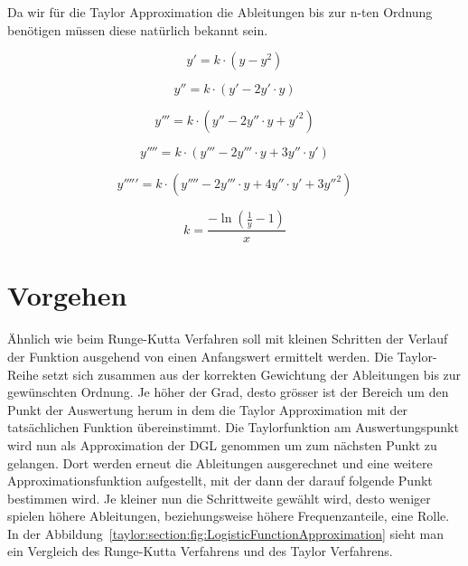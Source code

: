 Da wir für die Taylor Approximation die Ableitungen bis zur n-ten Ordnung benötigen müssen diese natürlich bekannt sein.

\begin{equation}
	y'=k\cdot (y-y^{2})
\end{equation}

\begin{equation}
	y''=k\cdot (y'-2y'\cdot y)
\end{equation}

\begin{equation}
	y'''=k\cdot (y''-2y''\cdot y+y'^{2})
\end{equation}

\begin{equation}
	y''''=k\cdot (y'''-2y'''\cdot y+3y''\cdot y')
\end{equation}

\begin{equation}
	y'''''=k\cdot (y''''-2y'''\cdot y+4y''\cdot y'+3y''^{2})
\end{equation}

\begin{equation}
	k=\frac{-\ln{(\frac{1}{y}-1)}}{x}
\end{equation}

\section{Vorgehen}
\label{taylor:subsection:Vorgehen}
Ähnlich wie beim Runge-Kutta Verfahren soll mit kleinen Schritten der Verlauf der Funktion ausgehend von einen Anfangswert ermittelt werden.
Die Taylor-Reihe setzt sich zusammen aus der korrekten Gewichtung der Ableitungen bis zur gewünschten Ordnung.
Je höher der Grad, desto grösser ist der Bereich um den Punkt der Auswertung herum in dem die Taylor Approximation mit der tatsächlichen Funktion übereinstimmt.
Die Taylorfunktion am Auswertungspunkt wird nun als Approximation der DGL genommen um zum nächsten Punkt zu gelangen.
Dort werden erneut die Ableitungen ausgerechnet und eine weitere Approximationsfunktion aufgestellt, mit der dann der darauf folgende Punkt bestimmen wird.
Je kleiner nun die Schrittweite gewählt wird, desto weniger spielen höhere Ableitungen, beziehungsweise höhere Frequenzanteile, eine Rolle.
In der Abbildung~\ref{taylor:section:fig:LogisticFunctionApproximation} sieht man ein Vergleich des Runge-Kutta Verfahrens und des Taylor Verfahrens.

